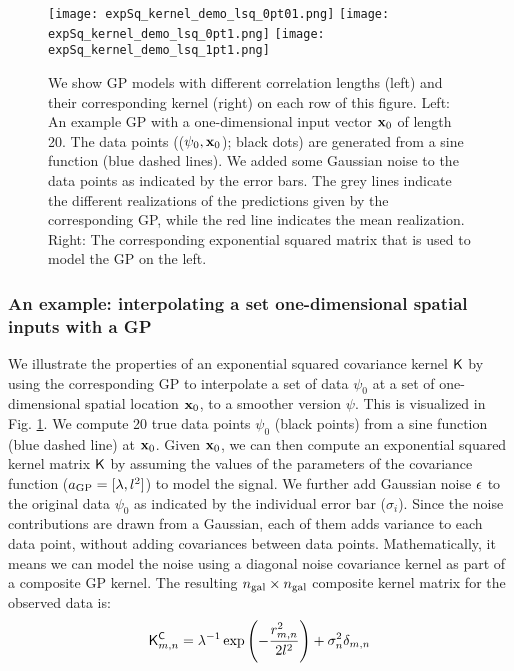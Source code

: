 \begin{figure}
	\centering
	\texttt{[image: expSq\_kernel\_demo\_lsq\_0pt01.png]}
	\texttt{[image: expSq\_kernel\_demo\_lsq\_0pt1.png]}
	\texttt{[image: expSq\_kernel\_demo\_lsq\_1pt1.png]}
	\caption{
		We show GP models with different correlation lengths (left) and their
		corresponding kernel (right) on each row of this figure.
		Left: An example GP with a one-dimensional input vector $\mathbf{x}_0$
		of length 20. The data points (($\psi_0, \mathbf{x}_0$); black dots) 
		are generated from a sine function (blue dashed lines).  
		We added some Gaussian noise to the data points as indicated by the error bars. 
		The grey lines indicate the different realizations of
		the predictions given by the corresponding GP, while the red line indicates the
		mean realization.  
		Right: The corresponding exponential squared matrix that is used to model
		the GP on the left. 
		\label{fig:one_d_gaussian_process}}
\end{figure}


\subsubsection{An example: interpolating a set one-dimensional spatial inputs
with a GP}
\label{subsubsec:interpolation}
We illustrate the properties of an exponential squared covariance kernel $\mathsf{K}$
by using the corresponding GP to interpolate a set of data $\psi_0$  
at a set of one-dimensional spatial location $\mathbf{x}_0$, to a smoother version
$\psi$. 
This is visualized in Fig. \ref{fig:one_d_gaussian_process}.
We compute 20 true data points $\psi_0$ (black points) from a sine function (blue dashed line) at
$\mathbf{x}_0$.
Given $\mathbf{x}_0$, we can then compute an exponential squared kernel matrix $\mathsf{K}$ 
by assuming the values of the parameters of the covariance function
($a_{\rm GP} = [\lambda, l^2]$) to model the signal. 
We further add Gaussian noise ${\bf\epsilon}$ to the original data $\psi_0$ as
indicated by the individual error bar ($\sigma_i$). 
Since the noise contributions are drawn
from a Gaussian,
each of them adds variance to each data point, without adding covariances
between data points.
Mathematically, it means we can model the noise using a diagonal noise 
covariance kernel as part of a composite GP kernel. 
The resulting $n_{\rm gal} \times n_{\rm gal}$ composite kernel matrix for the observed data is:
\begin{equation}
	\mathsf{K}^{\mathsf{C}}_{m, n} = \lambda^{-1} \exp \left(-\frac{r_{m,n}^2}{2
	l^2}\right) + \sigma_n^2
	\delta_{m, n}
\end{equation}

